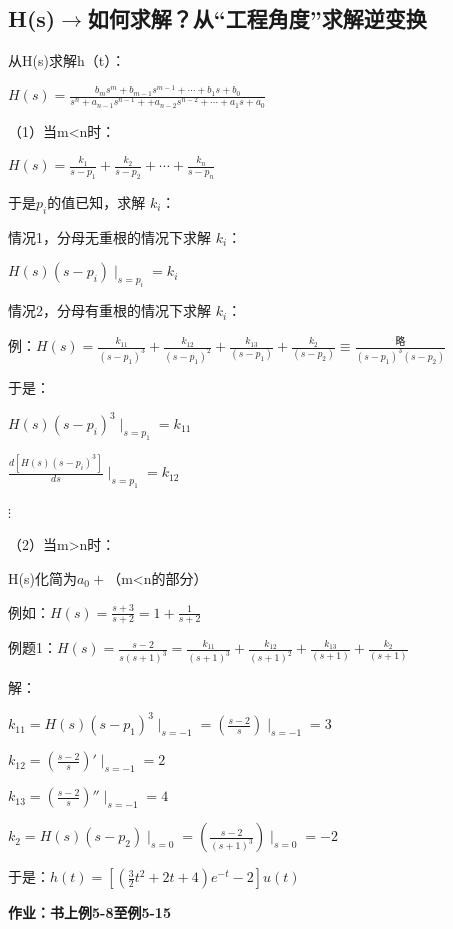 \documentclass[UTF8]{ctexart}
\begin{document}
\subsection{H(s)$\longrightarrow $如何求解？从“工程角度”求解逆变换}
从H(s)求解h（t）： \par 
\qquad $H(s)=\frac{b_ms^m+b_{m-1}s^{m-1}+\cdots +b_1s+b_0}{s^n+a_{n-1}s^{n-1}++a_{n-2}s^{n-2}+\cdots +a_1s+a_0} $\par 
（1）当m<n时：\par
\qquad $H(s)=\frac{k_1}{s-p_1}+ \frac{k_2}{s-p_2}+ \cdots +\frac{k_n}{s-p_n}$\par
于是$p_i$的值已知，求解 $k_i$：\par
情况1，分母无重根的情况下求解 $k_i$：\par
\qquad $H(s)(s-p_i)\mid _{s=p_i}=k_i$\par
情况2，分母有重根的情况下求解 $k_i$：\par
\qquad 例：$H(s)=\frac{k_{11}}{(s-p_1)^3}+\frac{k_{12}}{(s-p_1)^2}+\frac{k_{13}}{(s-p_1)}+\frac{k_2}{(s-p_2)} \equiv \frac{\text{略}}{(s-p_1)^3(s-p_2)}$\par
于是：\par
\qquad $H(s)(s-p_i)^3\mid _{s=p_1}=k_{11}$\par
\qquad $\frac{d[H(s)(s-p_i)^3 ] }{ds} \mid _{s=p_1}=k_{12}$\par
\qquad \qquad $\vdots $\par
（2）当m>n时：\par
H(s)化简为$a_0+$（m<n的部分）\par
例如：$H(s)=\frac{s+3}{s+2}=1+\frac{1}{s+2} $\par
例题1：$H(s)=\frac{s-2}{s(s+1)^3}=\frac{k_{11}}{(s+1)^3}+\frac{k_{12}}{(s+1)^2} +\frac{k_{13}}{(s+1)}+\frac{k_2}{(s+1)} $\par
解：\par
\qquad $k_{11}=H(s)(s-p_1)^3\mid _{s=-1}=(\frac{s-2}{s} )\mid _{s=-1}=3$\par
\qquad $k_{12}=(\frac{s-2}{s} )'\mid _{s=-1}=2$\par
\qquad $k_{13}=(\frac{s-2}{s} )''\mid _{s=-1}=4$\par
\qquad $k_{2}=H(s)(s-p_2)\mid _{s=0}=(\frac{s-2}{(s+1)^3} )\mid _{s=0}=-2$\par
于是：$h(t)=[(\frac{3}{2}t^2+2t+4 )e^{-t}-2 ]u(t) $\par
\textbf{作业：书上例5-8至例5-15} \par
\end{document}
